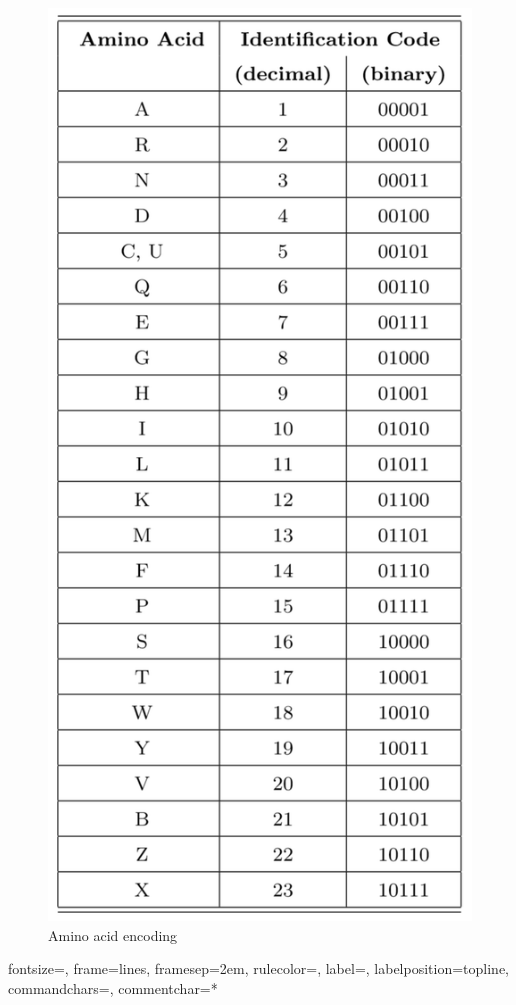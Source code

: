 \begin{figure}[h!]
	\centering
	\includegraphics[height=0.95\textheight]{imm/sw/tabella.png} 	\caption{Amino acid encoding	} 
	\label{tabAA}
\end{figure}
\newpage
{}%
{fontsize=\footnotesize,
	frame=lines,  %
	framesep=2em, %
	rulecolor=\color{Gray},
	label=,
	labelposition=topline,
	commandchars=\|\(\), %
	commentchar=*        %
}
 \label{file_pes}


